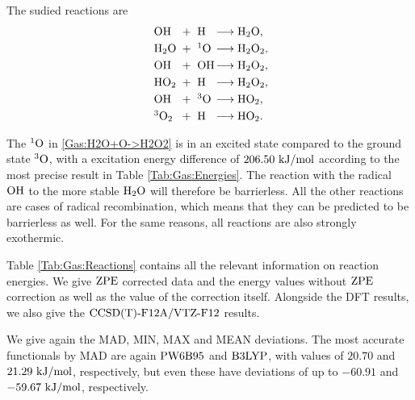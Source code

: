 \documentclass[8.5pt,twoside,twocolumn]{article}
\newcommand\zpe{\enmat{\te{ZPE}}}
\newcommand\singo{\enmat{{^1\te{O}}}}
\newcommand\tripo{\enmat{{^3\te{O}}}}
\newcommand\kmo{\enmat{\te {kJ/mol}}}
\theoremstyle{standard}
\begin{document}
The sudied reactions are
\newcommand\ronebox[1]{\makebox[.8cm][l]{\enmat{#1}}}
\newcommand\rtwobox[1]{\makebox[.7cm][l]{\ \enmat{#1}}}
\newcommand\prodbox[1]{\makebox[1.55cm][l]{\enmat{#1}}}
\begin{subequations}
\begin{align}
   \label{Gas:HO+H->H2O}
   \ronebox{\ho}+\rtwobox{\te{H}}\prodbox{\chemar\hto,} \\ 
   \label{Gas:H2O+O->H2O2}
   \ronebox{\hto}+\rtwobox{^1\te{O}}\prodbox{\chemar\htot,} \\
   \label{Gas:HO+HO->H2O2}
   \ronebox{\ho}+\rtwobox{\ho}\prodbox{\chemar\htot,} \\
   \label{Gas:HO2+H->H2O2}
   \ronebox{\hot}+\rtwobox{\te{H}}\prodbox{\chemar\htot,} \\
   \label{Gas:HO+O->HO2}
   \ronebox{\ho}+\rtwobox{^3\te{O}}\prodbox{\chemar\hot,} \\
   \label{Gas:3O2+H->HO2}
   \ronebox{^3\ot}+\rtwobox{\te{H}}\prodbox{\chemar\hot.}
\end{align}
\label{Gas:Reactions}
\end{subequations}

The $\singo$ in \eqref{Gas:H2O+O->H2O2} is in an excited state
compared to the ground state $\tripo$, with a excitation energy difference
of $206.50~\kmo$ according to the most precise result in Table
\ref{Tab:Gas:Energies}. The reaction with the radical $\text O \text H$ to the more stable
$\text H _2 \text O$ will therefore be barrierless. All the other reactions are cases of
radical recombination, which means that they can be predicted to be barrierless
as well. For the same reasons, all reactions are also strongly exothermic.

Table \ref{Tab:Gas:Reactions} contains all the relevant information on
reaction energies. We give $\zpe$ corrected data and the energy
values without $\zpe$ correction as well as the value of the correction
itself. Alongside the DFT results, we also give the $\text{CCSD(T)-F12A}/\text{VTZ-F}12$ results.

We give again the MAD, MIN, MAX and MEAN deviations.
The most accurate functionals by MAD are again $\text{PW6B95}$
and $\text{B3LYP}$, with values of $20.70$ and $21.29~\kmo$, respectively,
but even these have deviations of up to $-60.91$ and $-59.67~\kmo$,
respectively.
\end{document}
